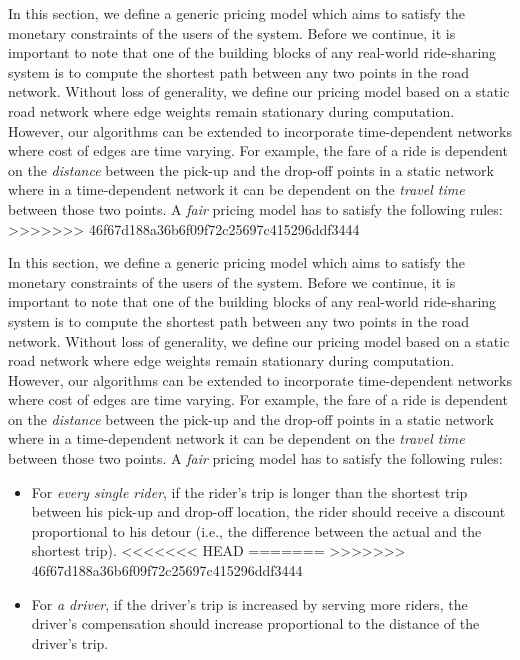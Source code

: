 In this section, we define a generic pricing model which aims to satisfy the monetary constraints of the users of the system. Before we continue, it is important to note that one of the building blocks of any real-world ride-sharing system is to compute the shortest path between any two points in the road network. Without loss of generality, we define our pricing model based on a static road network where edge weights remain stationary during computation. However, our algorithms can be extended to incorporate time-dependent networks where cost of edges are time varying. For example, the fare of a ride is dependent on the \textit{distance} between the pick-up and the drop-off points in a static network where in a time-dependent network it can be dependent on the \textit{travel time} between those two points. A \textit{fair} pricing model has to satisfy the following rules:
>>>>>>> 46f67d188a36b6f09f72c25697c415296ddf3444

In this section, we define a generic pricing model which aims to satisfy the monetary constraints of the users of the system. Before we continue, it is important to note that one of the building blocks of any real-world ride-sharing system is to compute the shortest path between any two points in the road network. Without loss of generality, we define our pricing model based on a static road network where edge weights remain stationary during computation. However, our algorithms can be extended to incorporate time-dependent networks where cost of edges are time varying. For example, the fare of a ride is dependent on the \textit{distance} between the pick-up and the drop-off points in a static network where in a time-dependent network it can be dependent on the \textit{travel time} between those two points. A \textit{fair} pricing model has to satisfy the following rules:
\vspace{-2mm}
\begin{itemize}
\item For \textit{every single rider}, if the rider's trip is longer than the shortest trip between his pick-up and drop-off location, the rider should receive a discount proportional to his detour (i.e., the difference between the actual and the shortest trip).
<<<<<<< HEAD
\vspace{-2mm}
=======
>>>>>>> 46f67d188a36b6f09f72c25697c415296ddf3444
\item For \textit{a driver}, if the driver's trip is increased by serving more riders, the driver's compensation should increase proportional to the distance of the driver's trip.
\end{itemize}

